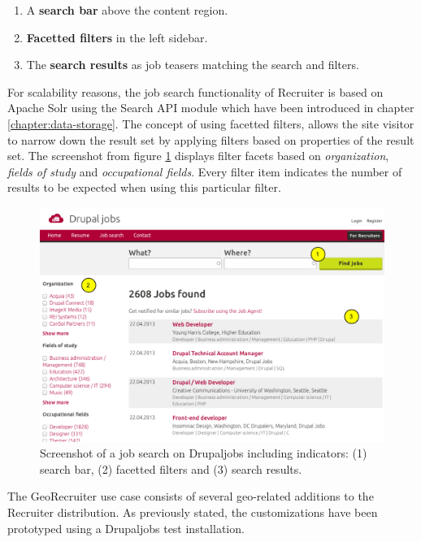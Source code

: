 \begin{enumerate}

\item [(1)] A \textbf{search bar} above the content region.
\item [(2)] \textbf{Facetted filters} in the left sidebar.
\item [(3)] The \textbf{search results} as job teasers matching the search and filters.

\end{enumerate}

For scalability reasons, the job search functionality of Recruiter is based on Apache Solr using the Search API module which have been introduced in chapter \ref{chapter:data-storage}. The concept of using facetted filters, allows the site visitor to narrow down the result set by applying filters based on properties of the result set. The screenshot from figure \ref{fig:recruiter-job-search} displays filter facets based on \textit{organization}, \textit{fields of study} and \textit{occupational fields}. Every filter item indicates the number of results to be expected when using this particular filter. 

\begin{figure}[h]
  \begin{center}
    \includegraphics[width=1\textwidth]{figures/recruiter_job_search.pdf}
    \caption{Screenshot of a job search on Drupaljobs including indicators: (1) search bar, (2) facetted filters and (3) search results.}
    \label{fig:recruiter-job-search}
  \end{center}
\end{figure}

The GeoRecruiter use case consists of several geo-related additions to the Recruiter distribution. As previously stated, the customizations have been prototyped using a Drupaljobs test installation.

